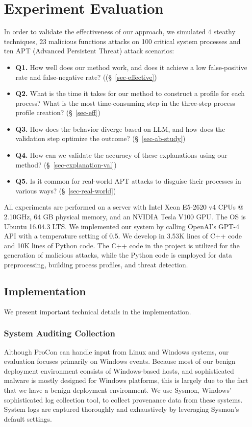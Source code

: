 \section{Experiment Evaluation}

In order to validate the effectiveness of our approach, we simulated 4 steathy techniques, 23 malicious functions attacks on 100 critical system processes and ten APT (Advanced Persistent Threat) attack scenarios:

\begin{itemize}
    \item \textbf{Q1.} How well does our method work, and does it achieve a low false-positive rate and false-negative rate? ((§~\ref{sec-effective})
    \item \textbf{Q2.} What is the time it takes for our method to construct a profile for each process? What is the most time-consuming step in the three-step process profile creation? (§~\ref{sec-eff})
    \item \textbf{Q3.} How does the behavior diverge based on LLM, and how does the validation step optimize the outcome? (§~\ref{sec-ab-study})
    \item \textbf{Q4.} How can we validate the accuracy of these explanations using our method? (§~\ref{sec-explanation-val})
    \item \textbf{Q5.} Is it common for real-world APT attacks to disguise their processes in various ways? (§~\ref{sec-real-world})
\end{itemize}
All experiments are performed on a server with Intel Xeon E5-2620 v4 CPUs @ 2.10GHz, 64 GB physical memory, and an NVIDIA Tesla V100 GPU. The OS is Ubuntu 16.04.3 LTS.
We implemented our system by calling OpenAI's GPT-4 API with a temperature setting of 0.5.
We develop \tool in 3.53K lines of C++ code and 10K lines of Python code.
The C++ code in the project is utilized for the generation of malicious attacks, while the Python code is employed for data preprocessing, building process profiles, and threat detection.


\subsection{Implementation}
We present important technical details in the implementation.

\subsubsection{System Auditing Collection}
Although ProCon can handle input from Linux and Windows systems, our evaluation focuses primarily on Windows events. Because most of our benign deployment environment consists of Windows-based hosts, and sophisticated malware is mostly designed for Windows platforms, this is largely due to the fact that we have a benign deployment environment. We use Sysmon, Windows' sophisticated log collection tool, to collect provenance data from these systems. System logs are captured thoroughly and exhaustively by leveraging Sysmon's default settings.

